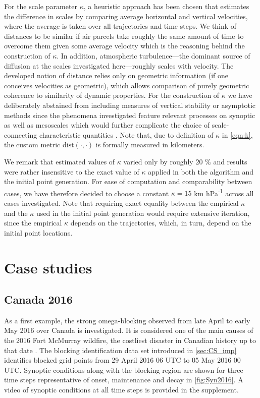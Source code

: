 For the scale parameter $\kappa$, a heuristic approach has been chosen that estimates the difference in scales by comparing average horizontal and vertical velocities, where the average is taken over all trajectories and time steps. We think of distances to be similar if air parcels take roughly the same amount of time to overcome them given some average velocity which is the reasoning behind the construction of $\kappa$. In addition, atmospheric turbulence---the dominant source of diffusion at the scales investigated here---roughly scales with velocity. The developed notion of distance relies only on geometric information (if one conceives velocities as geometric), which allows comparison of purely geometric coherence to similarity of dynamic properties. For the construction of $\kappa$ we have deliberately abstained from including measures of vertical stability or asymptotic methods since the phenomena investigated feature relevant processes on synoptic as well as mesoscales which would further complicate the choice of scale-connecting characteristic quantities \parencite{kleinScaleDependentModelsAtmospheric2010}. Note that, due to definition of $\kappa$ in \cref{eqn:k}, the custom metric $\text{dist}(\cdot, \cdot)$ is formally measured in kilometers.

We remark that estimated values of $\kappa$ varied only by roughly 20 \% and results were rather insensitive to the exact value of $\kappa$ applied in both the algorithm and the initial point generation. For ease of computation and comparability between cases, we have therefore decided to choose a constant $\kappa = 15$ km hPa\textsuperscript{-1} across all cases investigated. Note that requiring exact equality between the empirical $\kappa$ and the $\kappa$ used in the initial point generation would require extensive iteration, since the empirical $\kappa$ depends on the trajectories, which, in turn, depend on the initial point locations.

\section{Case studies} \label{sec:CS_exc}

\subsection{Canada 2016} \label{sec:CS_2016}

As a first example, the strong omega-blocking observed from late April to early May 2016 over Canada is investigated. It is considered one of the main causes of the 2016 Fort McMurray wildfire, the costliest disaster in Canadian history up to that date \parencite{statisticscanadaFortMcMurray20162017}. The blocking identification data set introduced in \cref{sec:CS_imp} identifies blocked grid points from 29 April 2016 06 UTC to 05 May 2016 00 UTC. Synoptic conditions along with the blocking region are shown for three time steps representative of onset, maintenance and decay in \cref{fig:Syn2016}. A video of synoptic conditions at all time steps is provided in the supplement.


